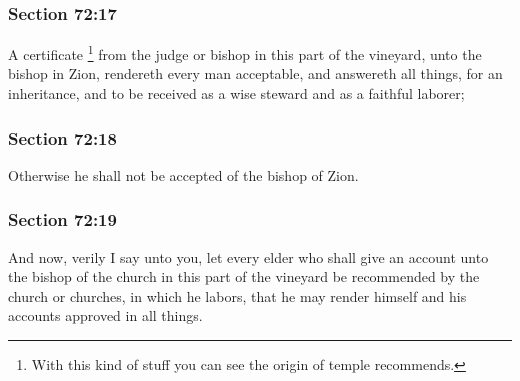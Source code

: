 	\subsubsection{Section 72:17} %
		\label{DC72-17}

		A certificate%
			\footnote{%
				With this kind of stuff you can see the origin of temple recommends.
				}
		from the judge or bishop in this part of the vineyard, unto the bishop in Zion, rendereth every man acceptable, and answereth all things, for an inheritance, and to be received as a wise steward and as a faithful laborer;


	\subsubsection{Section 72:18} %
		\label{DC72-18}

		Otherwise he shall not be accepted of the bishop of Zion.


	\subsubsection{Section 72:19} %
		\label{DC72-19}

		And now, verily I say unto you, let every elder who shall give an account unto the bishop of the church in this part of the vineyard be recommended by the church or churches, in which he labors, that he may render himself and his accounts approved in all things.


